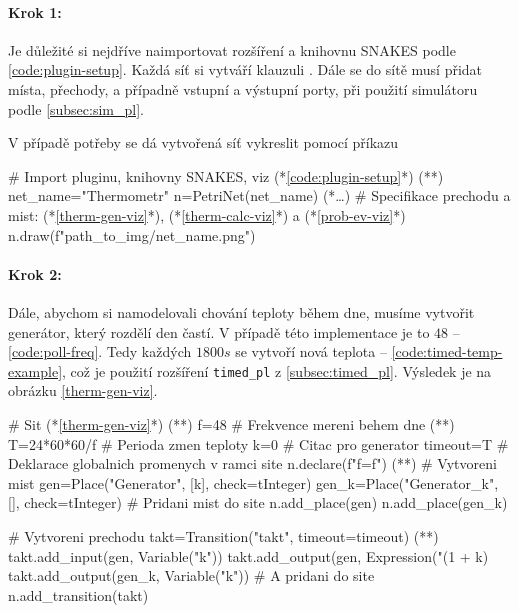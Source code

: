 \paragraph{Krok 1:}

Je důležité si nejdříve naimportovat rozšíření a knihovnu SNAKES podle \ref{code:plugin-setup}. Každá síť si vytváří klauzuli . Dále se do sítě musí přidat místa, přechody, a případně vstupní a výstupní porty, při použití simulátoru podle \ref{subsec:sim_pl}.

V případě potřeby se dá vytvořená síť vykreslit pomocí příkazu 

\begin{python}
 # Import pluginu, knihovny SNAKES, viz (*\ref{code:plugin-setup}*) (*\label{code:thermometr-draw}*)
 net_name="Thermometr"
 n=PetriNet(net_name)
 (*\ldots*) # Specifikace prechodu a mist: (*\ref{therm-gen-viz}*), (*\ref{therm-calc-viz}*) a (*\ref{prob-ev-viz}*)
 n.draw(f"{path_to_img}/{net_name}.png")
\end{python}

\paragraph{Krok 2:}

Dále, abychom si namodelovali chování teploty během dne, musíme vytvořit generátor, který rozdělí den častí. V případě této implementace je to $48$ -- \ref{code:poll-freq}. Tedy každých $1800s$ se vytvoří nová teplota -- \ref{code:timed-temp-example}, což je použití rozšíření \texttt{timed\_pl} z \ref{subsec:timed_pl}. Výsledek je na obrázku \ref{therm-gen-viz}.

\begin{python}
 # Sit (*\ref{therm-gen-viz}*) (*\label{code:gen-therm-draw}*)
 f=48 # Frekvence mereni behem dne (*\label{code:poll-freq}*)
 T=24*60*60/f # Perioda zmen teploty
 k=0 # Citac pro generator
 timeout=T
  # Deklarace globalnich promenych v ramci site
 n.declare(f"f={f}") (*\label{code:snakes-glob-var}*)
  # Vytvoreni mist
 gen=Place("Generator", [k], check=tInteger)
 gen_k=Place("Generator_k", [], check=tInteger)
 # Pridani mist do site
 n.add_place(gen)
 n.add_place(gen_k)

 # Vytvoreni prechodu
 takt=Transition("takt", timeout=timeout) (*\label{code:timed-temp-example}*)
 takt.add_input(gen, Variable("k"))
 takt.add_output(gen, Expression("(1 + k) %
 takt.add_output(gen_k, Variable("k"))
 # A pridani do site
 n.add_transition(takt)
\end{python}

